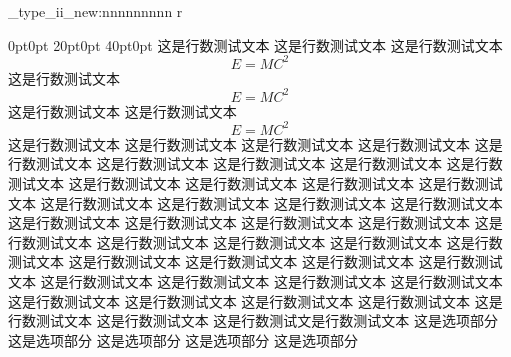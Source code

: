\documentclass[a4paper,fontset = windowsnew]{ctexbook}
\begin{document}
 \cexam_type_ii_new:nnnnnnnnn
 {r}
 {
 }
 {0pt}{0pt}
 {20pt}{0pt}
 {40pt}{0pt}
 {
    这是行数测试文本
    这是行数测试文本
    这是行数测试文本
    \begin{equation}
      E=MC^2
    \end{equation}
    这是行数测试文本
    \begin{equation}
      E=MC^2
    \end{equation}
    这是行数测试文本
    这是行数测试文本
    \begin{equation}
      E=MC^2
    \end{equation}
    这是行数测试文本
    这是行数测试文本
    这是行数测试文本
    这是行数测试文本
    这是行数测试文本
    这是行数测试文本
    这是行数测试文本
    这是行数测试文本
    这是行数测试文本
    这是行数测试文本
    这是行数测试文本
    这是行数测试文本
    这是行数测试文本
    这是行数测试文本
    这是行数测试文本
    这是行数测试文本
    这是行数测试文本
    这是行数测试文本
    这是行数测试文本
    这是行数测试文本
    这是行数测试文本
    这是行数测试文本
    这是行数测试文本
    这是行数测试文本
    这是行数测试文本
    这是行数测试文本
    这是行数测试文本
    这是行数测试文本
    这是行数测试文本
    这是行数测试文本
    这是行数测试文本
    这是行数测试文本
    这是行数测试文本
    这是行数测试文本
    这是行数测试文本
    这是行数测试文本
    这是行数测试文本
    这是行数测试文本
    这是行数测试文本
    这是行数测试文本
    这是行数测试文是行数测试文本
  }
  \newline
  这是选项部分
  这是选项部分
  这是选项部分
  这是选项部分
  这是选项部分

    
\end{document}
